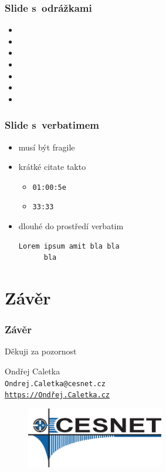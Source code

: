\documentclass[hyperref={pdfpagelabels=false},xcolor=dvipsnames,12pt,aspectratio=169]{beamer}
\begin{document}
\begin{frame}
	\frametitle{Slide s~odrážkami}
	\begin{itemize}
		\item 
		\item 
		\item 
		\item 
		\item 
		\item 
		\item 
	\end{itemize}
\end{frame}

\begin{frame}[fragile]
	\frametitle{Slide s~verbatimem}
	\begin{itemize}
		\item musí být fragile
		\item krátké citate takto
		\begin{itemize}
				\item \verb|01:00:5e| 
				\item \verb|33:33|
		\end{itemize}
		\item dlouhé do prostředí verbatim
		\begin{verbatim}
Lorem ipsum amit bla bla 
      bla
		\end{verbatim}
	\end{itemize}
\end{frame}

\section*{Závěr}
{
\begin{frame}
 \frametitle{Závěr}
 \begin{center}
 \large Děkuji za pozornost

 \vspace{1cm}
 Ondřej Caletka\\
 \texttt{Ondrej.Caletka@cesnet.cz}\\
 \texttt{\href{https://xn--ondej-kcb.caletka.cz}{https://Ondřej.Caletka.cz}}
 \begin{figure}
 \includegraphics[width=6cm]{fig/cesnet-logo}
 \end{figure}
 \end{center}
\end{frame}
}
\end{document}
